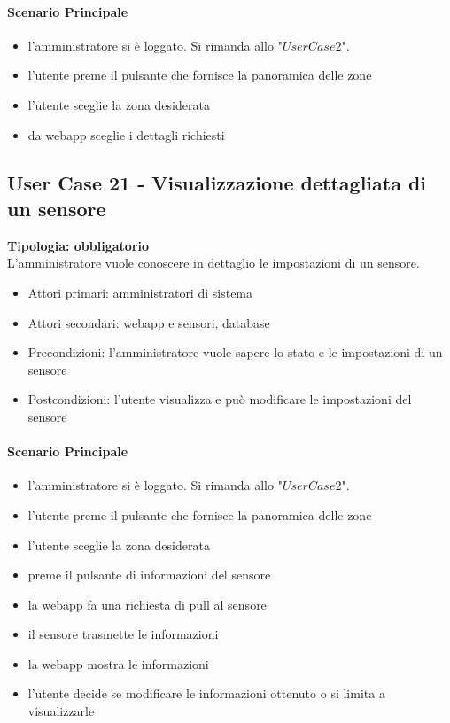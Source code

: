\documentclass[12pt]{article}
\begin{document}
\paragraph{Scenario Principale}
\begin{itemize}
	\item l'amministratore si è loggato. Si rimanda allo "$User Case 2$".
	\item l'utente preme il pulsante che fornisce la panoramica delle zone
	\item l'utente sceglie la zona desiderata
	\item da webapp sceglie i dettagli richiesti
\end{itemize}

\subsection{User Case 21 - Visualizzazione dettagliata di un sensore}
\textbf{Tipologia: obbligatorio} \\
L'amministratore vuole conoscere in dettaglio le impostazioni di un sensore.
\begin{itemize}
	\item Attori primari: amministratori di sistema
	\item Attori secondari: webapp e sensori, database
	\item Precondizioni: l'amministratore vuole sapere lo stato e le impostazioni di un sensore
	\item Postcondizioni: l'utente visualizza e può modificare le impostazioni del sensore
\end{itemize}
\paragraph{Scenario Principale}
\begin{itemize}
	\item l'amministratore si è loggato. Si rimanda allo "$User Case 2$".
	\item l'utente preme il pulsante che fornisce la panoramica delle zone
	\item l'utente sceglie la zona desiderata
	\item preme il pulsante di informazioni del sensore
	\item la webapp fa una richiesta di pull al sensore
	\item il sensore trasmette le informazioni
	\item la webapp mostra le informazioni
	\item l'utente decide se modificare le informazioni ottenuto o si limita a visualizzarle
\end{itemize}
\end{document}
